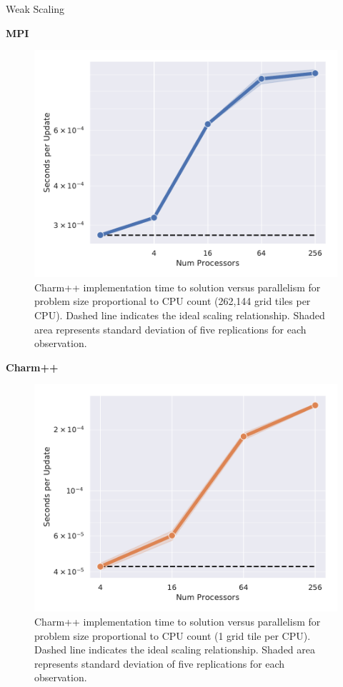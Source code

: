 \begin{block}{Weak Scaling}

\begin{alertblock}{\textbf{MPI}}
\begin{figure}
    \centering
    \includegraphics[width=\textwidth]{img/MPIWeak}
  	\caption{
    Charm++ implementation time to solution versus parallelism for problem size proportional to CPU count (262,144 grid tiles per CPU).
    Dashed line indicates the ideal scaling relationship.
    Shaded area represents standard deviation of five replications for each observation.
    }
\end{figure}
\end{alertblock}

\begin{alertblock}{\textbf{Charm++}}
\begin{figure}
    \centering
    \includegraphics[width=\textwidth]{img/CharmWeak}
  	\caption{
    Charm++ implementation time to solution versus parallelism for problem size proportional to CPU count (1 grid tile per CPU).
    Dashed line indicates the ideal scaling relationship.
    Shaded area represents standard deviation of five replications for each observation.
    }
\end{figure}
\end{alertblock}

\end{block}
